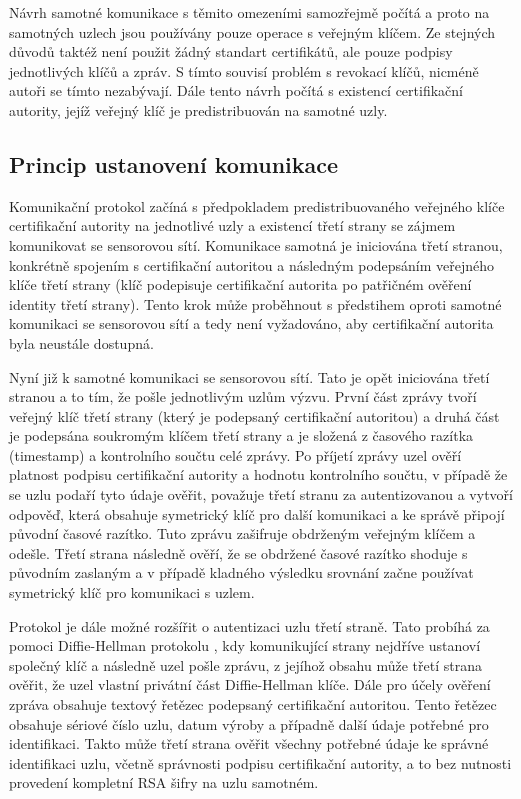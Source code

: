 \documentclass[11pt,final,twoside]{fithesis2}
\begin{document}
Návrh samotné komunikace s těmito omezeními samozřejmě počítá a proto na samotných uzlech jsou používány
pouze operace s veřejným klíčem. Ze stejných důvodů taktéž není použit žádný standart certifikátů, ale 
pouze podpisy jednotlivých klíčů a zpráv. S tímto souvisí problém s revokací klíčů, nicméně autoři se tímto nezabývají.
Dále tento návrh počítá s existencí certifikační autority, jejíž veřejný klíč je predistribuován na samotné uzly. 

\subsection{Princip ustanovení komunikace}
Komunikační protokol začíná s předpokladem predistribuovaného veřejného klíče certifikační autority na jednotlivé
uzly a existencí třetí strany se zájmem komunikovat se sensorovou sítí. Komunikace samotná je iniciována třetí
stranou, konkrétně spojením s certifikační autoritou a následným podepsáním veřejného klíče třetí strany (klíč podepisuje 
certifikační autorita po patřičném ověření identity třetí strany). Tento krok může proběhnout s předstihem oproti samotné 
komunikaci se sensorovou sítí a tedy není vyžadováno, aby certifikační autorita byla neustále dostupná. 

Nyní již k samotné komunikaci se sensorovou sítí. Tato je opět iniciována třetí stranou a to tím, že pošle jednotlivým uzlům 
výzvu. První část zprávy tvoří veřejný klíč třetí strany (který je podepsaný certifikační autoritou) a druhá část je podepsána 
soukromým klíčem třetí strany a je složená z časového razítka (timestamp) a kontrolního součtu celé zprávy. Po příjetí zprávy
uzel ověří platnost podpisu certifikační autority a hodnotu kontrolního součtu, v případě že se uzlu podaří tyto údaje ověřit, 
považuje třetí stranu za autentizovanou a vytvoří odpověď, která obsahuje symetrický klíč pro další komunikaci a ke správě připojí 
původní časové razítko. Tuto zprávu zašifruje obdrženým veřejným klíčem a odešle. Třetí strana následně ověří, že se obdržené 
časové razítko shoduje s původním zaslaným a v případě kladného výsledku srovnání začne používat symetrický klíč pro 
komunikaci s uzlem.

Protokol je dále možné rozšířit o autentizaci uzlu třetí straně. Tato probíhá za pomoci Diffie-Hellman protokolu \cite{Diffie1976}, 
kdy komunikující strany nejdříve ustanoví společný klíč a následně uzel pošle zprávu, z jejíhož obsahu může třetí strana ověřit,
že uzel vlastní privátní část Diffie-Hellman klíče. Dále pro účely ověření zpráva obsahuje  textový řetězec podepsaný 
certifikační autoritou. Tento řetězec obsahuje sériové číslo uzlu, datum výroby a případně další údaje potřebné pro identifikaci. 
Takto může třetí strana ověřit všechny potřebné údaje ke správné identifikaci uzlu, včetně správnosti podpisu certifikační autority, 
a to bez nutnosti provedení kompletní RSA šifry na uzlu samotném.
\end{document}
